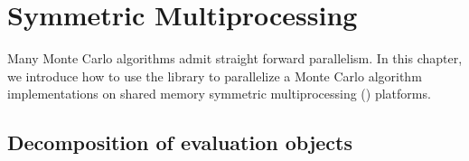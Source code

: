 %
%
%
%

\chapter{Symmetric Multiprocessing}
\label{chap:Symmetric Multiprocessing}

Many Monte Carlo algorithms admit straight forward parallelism. In this
chapter, we introduce how to use the library to parallelize a Monte Carlo
algorithm implementations on shared memory symmetric multiprocessing (\smp)
platforms.

\section{Decomposition of evaluation objects}
\label{sec:Decomposition of evaluation objects}

